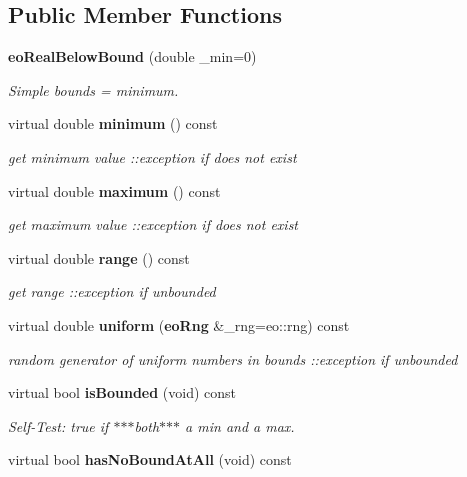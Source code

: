 \subsection*{Public Member Functions}
\begin{CompactItemize}
\item 
{\bf eo\-Real\-Below\-Bound} (double \_\-min=0)\label{classeo_real_below_bound_a1}

\begin{CompactList}\small\item\em Simple bounds = minimum. \item\end{CompactList}\item 
virtual double {\bf minimum} () const \label{classeo_real_below_bound_a2}

\begin{CompactList}\small\item\em get minimum value ::exception if does not exist \item\end{CompactList}\item 
virtual double {\bf maximum} () const \label{classeo_real_below_bound_a3}

\begin{CompactList}\small\item\em get maximum value ::exception if does not exist \item\end{CompactList}\item 
virtual double {\bf range} () const \label{classeo_real_below_bound_a4}

\begin{CompactList}\small\item\em get range ::exception if unbounded \item\end{CompactList}\item 
virtual double {\bf uniform} ({\bf eo\-Rng} \&\_\-rng=eo::rng) const \label{classeo_real_below_bound_a5}

\begin{CompactList}\small\item\em random generator of uniform numbers in bounds ::exception if unbounded \item\end{CompactList}\item 
virtual bool {\bf is\-Bounded} (void) const \label{classeo_real_below_bound_a6}

\begin{CompactList}\small\item\em Self-Test: true if $\ast$$\ast$$\ast$both$\ast$$\ast$$\ast$ a min and a max. \item\end{CompactList}\item 
virtual bool {\bf has\-No\-Bound\-At\-All} (void) const \label{classeo_real_below_bound_a7}


\end{CompactItemize}
